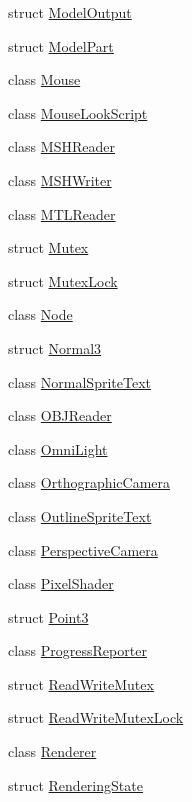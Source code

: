 \begin{DoxyCompactItemize}
\item 
struct \hyperlink{structmage_1_1_model_output}{Model\+Output}
\item 
struct \hyperlink{structmage_1_1_model_part}{Model\+Part}
\item 
class \hyperlink{classmage_1_1_mouse}{Mouse}
\item 
class \hyperlink{classmage_1_1_mouse_look_script}{Mouse\+Look\+Script}
\item 
class \hyperlink{classmage_1_1_m_s_h_reader}{M\+S\+H\+Reader}
\item 
class \hyperlink{classmage_1_1_m_s_h_writer}{M\+S\+H\+Writer}
\item 
class \hyperlink{classmage_1_1_m_t_l_reader}{M\+T\+L\+Reader}
\item 
struct \hyperlink{structmage_1_1_mutex}{Mutex}
\item 
struct \hyperlink{structmage_1_1_mutex_lock}{Mutex\+Lock}
\item 
class \hyperlink{classmage_1_1_node}{Node}
\item 
struct \hyperlink{structmage_1_1_normal3}{Normal3}
\item 
class \hyperlink{classmage_1_1_normal_sprite_text}{Normal\+Sprite\+Text}
\item 
class \hyperlink{classmage_1_1_o_b_j_reader}{O\+B\+J\+Reader}
\item 
class \hyperlink{classmage_1_1_omni_light}{Omni\+Light}
\item 
class \hyperlink{classmage_1_1_orthographic_camera}{Orthographic\+Camera}
\item 
class \hyperlink{classmage_1_1_outline_sprite_text}{Outline\+Sprite\+Text}
\item 
class \hyperlink{classmage_1_1_perspective_camera}{Perspective\+Camera}
\item 
class \hyperlink{classmage_1_1_pixel_shader}{Pixel\+Shader}
\item 
struct \hyperlink{structmage_1_1_point3}{Point3}
\item 
class \hyperlink{classmage_1_1_progress_reporter}{Progress\+Reporter}
\item 
struct \hyperlink{structmage_1_1_read_write_mutex}{Read\+Write\+Mutex}
\item 
struct \hyperlink{structmage_1_1_read_write_mutex_lock}{Read\+Write\+Mutex\+Lock}
\item 
class \hyperlink{classmage_1_1_renderer}{Renderer}
\item 
struct \hyperlink{structmage_1_1_rendering_state}{Rendering\+State}

\end{DoxyCompactItemize}
